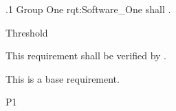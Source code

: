 \ONERQMTV
{\RqtNumberBase.1}
{Group One}
{rqt:Software_One}
{\ThisSys shall \TBD.}
{
	\item [Phase 1] Threshold
}
{This requirement shall be verified by \TBD.}
{
\item [N/A] This is a base requirement.
}
{
	\item \TBD
}
{P1}

